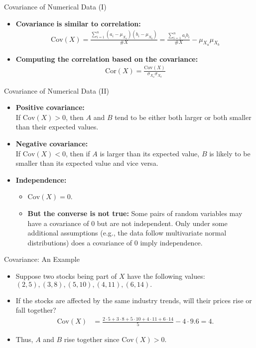 \begin{frame}{Covariance of Numerical Data (I)}
	\begin{itemize}
		\item \textbf{\color{airforceblue}Covariance} \textbf{is similar to 
		correlation:}\\
		\begin{align}
			\text{Cov}(X) = 
			\frac{\sum_{i=1}^{n}(a_i-\mu_{X_a})(b_i-\mu_{X_b})}{\#X} = 
			\frac{\sum_{i=1}^{n}a_ib_i}{\#X}-\mu_{X_a}\mu_{X_b}
		\end{align}
		\item \textbf{Computing the correlation based on the covariance:}\\
		\begin{align}
			\text{Cor}({X}) = \frac{\text{Cov}(X)}{\sigma_{X_a}\sigma_{X_b}}
		\end{align}
	\end{itemize}
\end{frame}

\begin{frame}{Covariance of Numerical Data (II)}
	\begin{itemize}
		\item \textbf{Positive covariance:}\\
		If $\text{Cov}(X) > 0$, then $A$ and $B$ tend to be either both 
		larger or both smaller than their expected values.
		\item \textbf{Negative covariance:}\\
		If $\text{Cov}(X) < 0$, then if $A$ is larger than its expected 
		value, $B$ is likely to be smaller than its expected value and vice 
		versa.
		\item \textbf{Independence:}
		\begin{itemize}
			\item $\text{Cov}(X) = 0$.
			\item \textbf{\color{airforceblue}But the converse is not true:} 
			Some pairs of random variables may have a covariance of $0$ but are 
			not independent. Only under some additional assumptions (e.g., the 
			data follow multivariate normal distributions) does a covariance of 
			$0$ imply independence.
		\end{itemize}
	\end{itemize}
\end{frame}

\begin{frame}{Covariance: An Example}
	\begin{itemize}
		\item Suppose two stocks being part of $X$ have the following values:\\
		$(2,5), (3,8), (5,10), (4,11), (6,14).$
		\item If the stocks are affected by the same industry trends, will 
		their prices rise or fall together?
		\begin{align}
			\text{Cov}(X) & = \frac{2\cdot5 + 3\cdot 8 + 5 \cdot 10 + 4 \cdot 
			11 + 6 \cdot 14}{5} - 4\cdot 9.6 = 4. 
		\end{align}
		\item Thus, $A$ and $B$ rise together since $\text{Cov}(X) > 0$.
	\end{itemize}
\end{frame}
